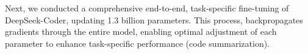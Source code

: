 



Next, we conducted a comprehensive end-to-end, task-specific fine-tuning of DeepSeek-Coder, updating 1.3 billion parameters. This process, backpropagates gradients through the entire model, enabling optimal adjustment of each parameter to enhance task-specific performance (\ie code summarization).

